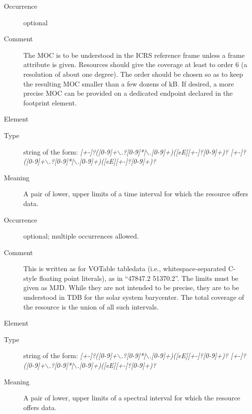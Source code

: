 \documentclass[11pt,a4paper]{ivoa}
\begin{document}
\begin{generated}
\begin{bigdescription}
\begin{description}
\item[Occurrence] optional
\item[Comment] 
                  The MOC is to be understood in the ICRS reference frame 
                  unless a frame attribute is given.
                  Resources should give the coverage at least to order 6
                  (a resolution of about one degree).  The order should be
                  chosen so as to keep the resulting MOC smaller than a few
                  dozens of kB.  If desired, a more precise MOC can be provided
                  on a dedicated endpoint declared in the footprint element.
               

\end{description}
\item[Element \xmlel{temporal}]
\begin{description}
\item[Type] string of the form: \emph{[+-]?([0-9]+$\backslash$.?[0-9]*|$\backslash$.[0-9]+)([eE][+-]?[0-9]+)? [+-]?([0-9]+$\backslash$.?[0-9]*|$\backslash$.[0-9]+)([eE][+-]?[0-9]+)?}
\item[Meaning] 
                  A pair of lower, upper limits of a time interval 
                  for which the resource offers data.
               
\item[Occurrence] optional; multiple occurrences allowed.

\item[Comment] 
                  This is written as for VOTable tabledata (i.e., 
                  whitespace-separated C-style floating point literals), as
                  in “47847.2 51370.2”.
                  The limits must be given as MJD.  While they
                  are not intended to be precise, they are to be understood
                  in TDB for the solar system barycenter.  The total coverage
                  of the resource is the union of all such intervals.
               

\end{description}
\item[Element \xmlel{spectral}]
\begin{description}
\item[Type] string of the form: \emph{[+-]?([0-9]+$\backslash$.?[0-9]*|$\backslash$.[0-9]+)([eE][+-]?[0-9]+)? [+-]?([0-9]+$\backslash$.?[0-9]*|$\backslash$.[0-9]+)([eE][+-]?[0-9]+)?}
\item[Meaning] 
                  A pair of lower, upper limits of a spectral interval 
                  for which the resource offers data.
               

\end{description}
\end{bigdescription}
\end{generated}
\end{document}
